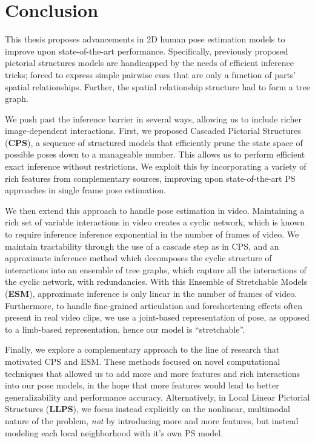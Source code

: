 \chapter{Conclusion}

This thesis proposes advancements in 2D human pose estimation models to improve 
upon state-of-the-art performance.  Specifically, previously proposed pictorial 
structures models are handicapped by the needs of efficient inference tricks; 
forced to express simple pairwise cues that are only a function of parts' 
spatial relationships.  Further, the spatial relationship structure had to form 
a tree graph.

We push past the inference barrier in several ways, allowing us to include 
richer image-dependent interactions.  First, we proposed Cascaded Pictorial 
Structures ({\bf CPS}), a sequence of structured models that efficiently prune 
the state space of possible poses down to a manageable number.  This allows us 
to perform efficient exact inference without restrictions.  We exploit this by 
incorporating a variety of rich features from complementary sources, improving 
upon state-of-the-art PS approaches in single frame pose estimation.

We then extend this approach to handle pose estimation in video.  Maintaining a 
rich set of variable interactions in video creates a cyclic network, which is 
known to require inference inference exponential in the number of frames of 
video.  We maintain tractability through the use of a cascade step as in CPS, 
and an approximate inference method which decomposes the cyclic structure of 
interactions into an ensemble of tree graphs, which capture all the 
interactions of the cyclic network, with redundancies.  With this Ensemble of 
Stretchable Models ({\bf ESM}), approximate inference is only linear in the 
number of frames of video.  Furthermore, to handle fine-grained articulation 
and foreshortening effects often present in real video clips, we use a 
joint-based representation of pose, as opposed to a limb-based representation, 
hence our model is ``stretchable''.

Finally, we explore a complementary approach to the line of research that 
motivated CPS and ESM.  These methods focused on novel computational techniques 
that allowed us to add more and more features and rich interactions into our 
pose models, in the hope that more features would lead to better 
generalizability and performance accuracy.  Alternatively, in Local Linear 
Pictorial Structures ({\bf LLPS}), we focus instead explicitly on the 
nonlinear, multimodal nature of the problem, {\em not} by introducing more and 
more features, but instead modeling each local neighborhood with it's own PS 
model.


